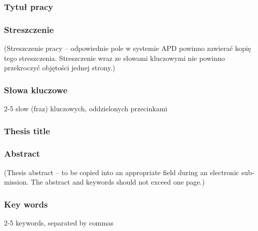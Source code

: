 \documentclass[a4paper,twoside,12pt]{book}
\begin{document}
\cleardoublepage
 

\rmfamily
\normalfont
\pagestyle{empty}

  


\subsubsection*{Tytuł pracy} \tytul

\subsubsection*{Streszczenie}  
(Streszczenie pracy – odpowiednie pole w systemie APD powinno zawierać kopię tego streszczenia. Streszczenie wraz ze słowami kluczowymi nie powinno przekroczyć objętości jednej strony.)

\subsubsection*{Słowa kluczowe} 
2-5 slow (fraz) kluczowych, oddzielonych przecinkami

\subsubsection*{Thesis title} 
\begin{otherlanguage}{british}
\Title
\end{otherlanguage}

\subsubsection*{Abstract} 
\begin{otherlanguage}{british}
(Thesis abstract – to be copied into an appropriate field during an electronic submission. The abstract and keywords should not exceed one page.)
\end{otherlanguage}
\subsubsection*{Key words}  
\begin{otherlanguage}{british}
2-5 keywords, separated by commas
\end{otherlanguage}
\end{document}
